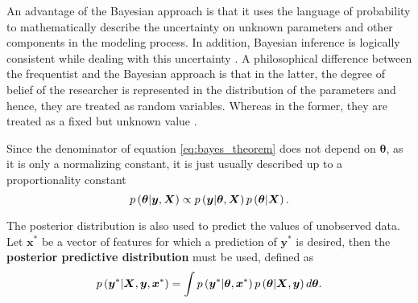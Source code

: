 An advantage of the Bayesian approach is that it uses the language of probability to mathematically describe the uncertainty on unknown parameters and other components in the modeling process.
In addition, Bayesian inference is logically consistent while dealing with this uncertainty \cite{cox1946probability, cox1963algebra, jaynes2003probability, o2004advanced}. A philosophical difference between the frequentist and the Bayesian approach is that in the latter, the degree of belief of the researcher is represented in the distribution of the parameters and hence, they are treated as random variables. Whereas in the former, they are treated as a fixed but unknown value \cite{o2004advanced}.

Since the denominator of equation \eqref{eq:bayes_theorem} does not depend on $\boldsymbol{\theta}$, as it is only a normalizing constant, it is just usually described up to a proportionality constant
\begin{equation}
  \label{eq:bayes_theorem_prop}
    p\left( \boldsymbol{\theta} | \boldsymbol{y}, \boldsymbol{X} \right) \propto p\left( \boldsymbol{y} | \boldsymbol{\theta}, \boldsymbol{X} \right) p\left( \boldsymbol{\theta} | \boldsymbol{X} \right).
\end{equation}

The posterior distribution is also used to predict the values of unobserved data. Let $\boldsymbol{x}^*$ be a vector of features for which a prediction of $\boldsymbol{y}^*$ is desired, then the \textbf{posterior predictive distribution} must be used, defined as
\begin{equation}
  \label{eq:post_pred_dist}
  p\left( \boldsymbol{y}^* | \boldsymbol{X}, \boldsymbol{y}, \boldsymbol{x}^* \right) = \int p\left( \boldsymbol{y}^* | \boldsymbol{\theta}, \boldsymbol{x}^* \right) p\left( \boldsymbol{\theta} | \boldsymbol{X}, \boldsymbol{y} \right) d\boldsymbol{\theta}.
\end{equation}

